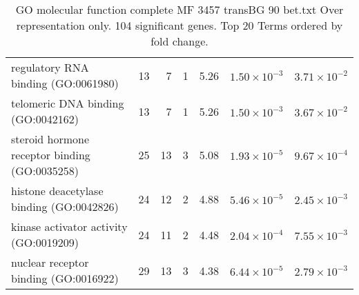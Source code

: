 \begin{table}[ht]
\begin{adjustbox}{width=\textwidth}
\begin{tabular}{lrrrlrr}
  regulatory RNA binding (GO:0061980) & 13 & 7 & 1 & 5.26 & $1.50 \times 10^{-3}$ & $3.71 \times 10^{-2}$ \\ 
  telomeric DNA binding (GO:0042162) & 13 & 7 & 1 & 5.26 & $1.50 \times 10^{-3}$ & $3.67 \times 10^{-2}$ \\ 
  steroid hormone receptor binding (GO:0035258) & 25 & 13 & 3 & 5.08 & $1.93 \times 10^{-5}$ & $9.67 \times 10^{-4}$ \\ 
  histone deacetylase binding (GO:0042826) & 24 & 12 & 2 & 4.88 & $5.46 \times 10^{-5}$ & $2.45 \times 10^{-3}$ \\ 
  kinase activator activity (GO:0019209) & 24 & 11 & 2 & 4.48 & $2.04 \times 10^{-4}$ & $7.55 \times 10^{-3}$ \\ 
  nuclear receptor binding (GO:0016922) & 29 & 13 & 3 & 4.38 & $6.44 \times 10^{-5}$ & $2.79 \times 10^{-3}$ \\ 
   \hline
\end{tabular}
\end{adjustbox}
\caption{GO molecular function complete MF 3457 transBG 90 bet.txt Over representation only. 104 significant genes. Top 20 Terms ordered by fold change. } 
\label{tab:GO molecular function complete MF 3457 transBG 90 bet.txt Over representation only. 104 significant genes. Top 20 Terms ordered by fold change. }
\end{table}


